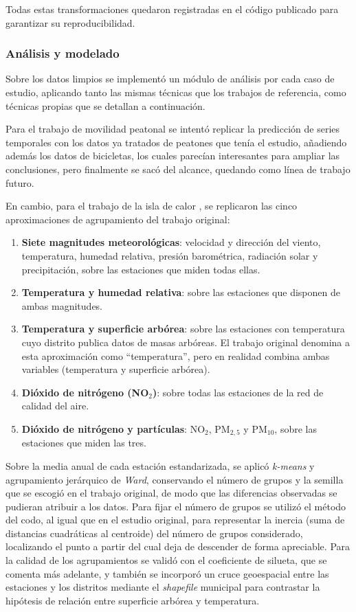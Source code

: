Todas estas transformaciones quedaron registradas en el código publicado para garantizar su reproducibilidad.

\subsubsection{Análisis y modelado} \label{sec:Metodos_analisis}

Sobre los datos limpios se implementó un módulo de análisis por cada caso de estudio, aplicando tanto las mismas técnicas que los trabajos de referencia, como técnicas propias que se detallan a continuación.

Para el trabajo de movilidad peatonal \citep{SaizSantos2023} se intentó replicar la predicción de series temporales con los datos ya tratados de peatones que tenía el estudio, añadiendo además los datos de bicicletas, los cuales parecían interesantes para ampliar las conclusiones, pero finalmente se sacó del alcance, quedando como línea de trabajo futuro.

En cambio, para el trabajo de la isla de calor \citep{Meneses2023Madrid}, se replicaron las cinco aproximaciones de agrupamiento del trabajo original: 
\begin{enumerate}
	\item \textbf{Siete magnitudes meteorológicas}: velocidad y dirección del viento, temperatura, humedad relativa, presión barométrica, radiación solar y precipitación, sobre las estaciones que miden todas ellas.
	\item \textbf{Temperatura y humedad relativa}: sobre las estaciones que disponen de ambas magnitudes.
	\item \textbf{Temperatura y superficie arbórea}: sobre las estaciones con temperatura cuyo distrito publica datos de masas arbóreas. El trabajo original denomina a esta aproximación como ``temperatura'', pero en realidad combina ambas variables (temperatura y superficie arbórea).
	\item \textbf{Dióxido de nitrógeno (NO$_2$)}: sobre todas las estaciones de la red de calidad del aire.
	\item \textbf{Dióxido de nitrógeno y partículas}: NO$_2$, PM$_{2,5}$ y PM$_{10}$, sobre las estaciones que miden las tres.
\end{enumerate} 

Sobre la media anual de cada estación estandarizada, se aplicó \textit{k-means} y agrupamiento jerárquico de \textit{Ward}, conservando el número de grupos y la semilla que se escogió en el trabajo original, de modo que las diferencias observadas se pudieran atribuir a los datos. Para fijar el número de grupos se utilizó el método del codo, al igual que en el estudio original, para representar la inercia (suma de distancias cuadráticas al centroide) del número de grupos considerado, localizando el punto a partir del cual deja de descender de forma apreciable. Para la calidad de los agrupamientos se validó con el coeficiente de silueta, que se comenta más adelante, y también se incorporó un cruce geoespacial entre las estaciones y los distritos mediante el \textit{shapefile} municipal para contrastar la hipótesis de relación entre superficie arbórea y temperatura.

